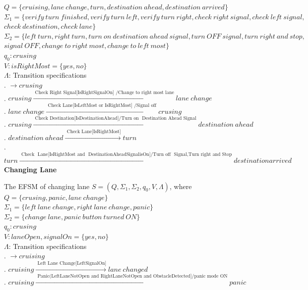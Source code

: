 \documentclass[12pt]{article}
\begin{document}
\begin{spacing}{1.5}
\noindent $Q = \{cruising,lane~change,turn,destination~ahead,destination~arrived\}$\\
\noindent $\Sigma_1 = \{verify~turn~finished,verify~turn~left,verify~turn~right,check~right~signal
,check~left~signal,$\\
\noindent $check~destination,check~lane\}$\\
\noindent $\Sigma_2 = \{left~turn,right~turn,turn~on~destination~ahead~signal
,turn~OFF~signal,turn~right~and~stop,$\\
\noindent $signal~OFF,
change~to~right~most,change~to~left~most\}$\\
\noindent $q_0: crusing$\\
\noindent $V: isRightMost = \{yes, no\}$\\
\noindent $\Lambda$: Transition specifications\\
. $\rightarrow crusing$\\
. $crusing \xrightarrow {\text { Check~Right~Signal[IsRightSignalOn]
/Change~to~right~most~lane}} lane~change$\\
. $lane~change \xrightarrow {\text { Check~Lane[IsLeftMost~or~IsRightMost]
/Signal~off}} crusing$\\
. $crusing \xrightarrow {\text { Check~Destination[IsDestinationAhead]/Turn~on~ Destination~Ahead~Signal}} destination~ahead$\\
. $destination~ahead \xrightarrow {\text { Check~Lane[IsRightMost]}} turn$\\
. $turn \xrightarrow {\text { Check~ Lane[IsRightMost~and~ DestinationAheadSignalisOn]/Turn~off~ Signal,Turn~right~and~Stop}} destination arrived$\\



\newpage
\noindent \textbf{Changing Lane}

\noindent The EFSM of changing lane $S = (Q, \Sigma_1, \Sigma_2, q_0, V, \Lambda)$, where\\

\noindent $Q = \{crusing,panic,lane~change\}$\\
\noindent $\Sigma_1 = \{left~lane~change,right~lane~change,panic\}$\\
\noindent $\Sigma_2 = \{change~lane,panic~button~turned~ON\}$\\
\noindent $q_0: crusing$\\
\noindent $V: laneOpen, signalOn = \{yes, no\}$\\
\noindent $\Lambda$: Transition specifications\\
. $\rightarrow cruising$\\
. $cruising \xrightarrow {\text { Left~Lane~Change[LeftSignalOn]}} lane~changed$\\
. $cruising \xrightarrow {\text { Panic(LeftLaneNotOpen and RightLaneNotOpen and ObstacleDetected]/panic~mode~ON}} panic$\\


\end{spacing}
\end{document}
